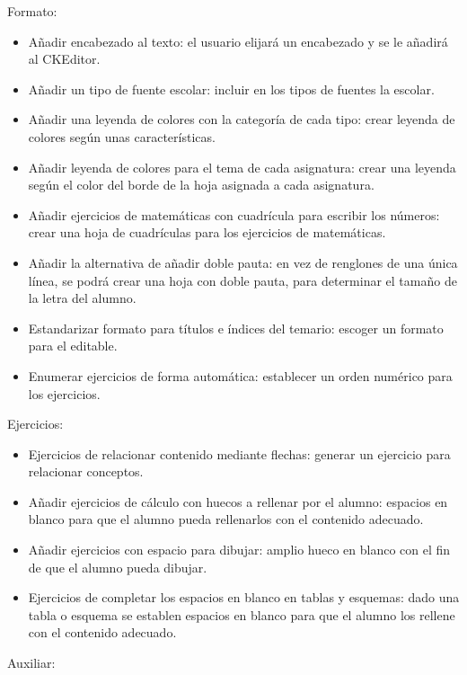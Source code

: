 Formato: 
\begin{itemize}
  \item Añadir encabezado al texto: el usuario elijará un encabezado y se le añadirá al CKEditor.
  \item Añadir un tipo de fuente escolar: incluir en los tipos de fuentes la escolar.
  \item Añadir una leyenda de colores con la categoría de cada tipo: crear leyenda de colores según unas características.
  \item Añadir leyenda de colores para el tema de cada asignatura: crear una leyenda según el color del borde de la hoja asignada a cada asignatura.
  \item Añadir ejercicios de matemáticas con cuadrícula para escribir los números: crear una hoja de cuadrículas para los ejercicios de matemáticas.
  \item Añadir la alternativa de añadir doble pauta: en vez de renglones de una única línea, se podrá crear una hoja con doble pauta, para determinar el tamaño de la letra del alumno.
  \item Estandarizar formato para títulos e índices del temario: escoger un formato para el editable.
  \item Enumerar ejercicios de forma automática: establecer un orden numérico para los ejercicios.
\end{itemize}
Ejercicios:
\begin{itemize}
  \item Ejercicios de relacionar contenido mediante flechas: generar un ejercicio para relacionar conceptos.
  \item Añadir ejercicios de cálculo con huecos a rellenar por el alumno: espacios en blanco para que el alumno pueda rellenarlos con el contenido adecuado.
  \item Añadir ejercicios con espacio para dibujar: amplio hueco en blanco con el fin de que el alumno pueda dibujar.
  \item Ejercicios de completar los espacios en blanco en tablas y esquemas: dado una tabla o esquema se establen espacios en blanco para que el alumno los rellene con el contenido adecuado.
\end{itemize}
Auxiliar:
